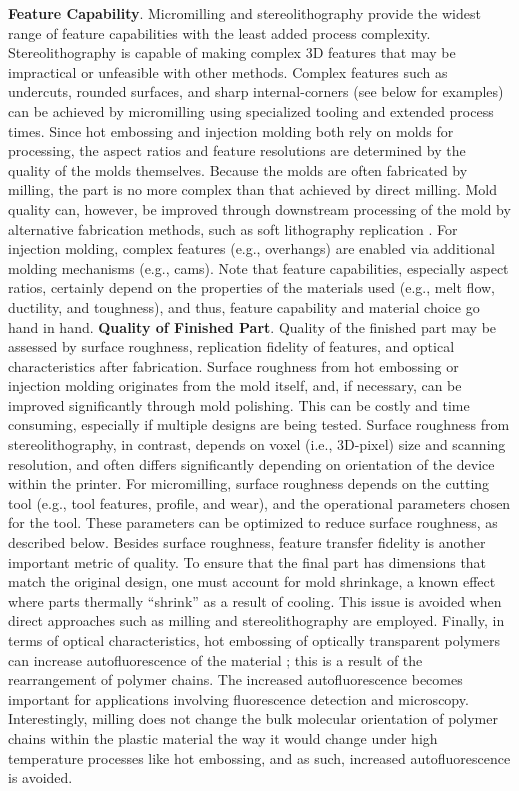 \textbf{Feature Capability}. Micromilling and stereolithography provide the widest range of feature capabilities with the least added process complexity. Stereolithography is capable of making complex 3D features that may be impractical or unfeasible with other methods. Complex features such as undercuts, rounded surfaces, and sharp internal-corners (see below for examples) can be achieved by micromilling using specialized tooling and extended process times. Since hot embossing and injection molding both rely on molds for processing, the aspect ratios and feature resolutions are determined by the quality of the molds themselves. Because the molds are often fabricated by milling, the part is no more complex than that achieved by direct milling. Mold quality can, however, be improved through downstream processing of the mold by alternative fabrication methods, such as soft lithography replication \cite{Young2011}. For injection molding, complex features (e.g., overhangs) are enabled via additional molding mechanisms (e.g., cams). Note that feature capabilities, especially aspect ratios, certainly depend on the properties of the materials used (e.g., melt flow, ductility, and toughness), and thus, feature capability and material choice go hand in hand. 
\textbf{Quality of Finished Part}. Quality of the finished part may be assessed by surface roughness, replication fidelity of features, and optical characteristics after fabrication. Surface roughness from hot embossing or injection molding originates from the mold itself, and, if necessary, can be improved significantly through mold polishing. This can be costly and time consuming, especially if multiple designs are being tested. Surface roughness from stereolithography, in contrast, depends on voxel (i.e., 3D-pixel) size and scanning resolution, and often differs significantly depending on orientation of the device within the printer. For micromilling, surface roughness depends on the cutting tool (e.g., tool features, profile, and wear), and the operational parameters chosen for the tool. These parameters can be optimized to reduce surface roughness, as described below. 
Besides surface roughness, feature transfer fidelity is another important metric of quality. To ensure that the final part has dimensions that match the original design, one must account for mold shrinkage, a known effect where parts thermally “shrink” as a result of cooling. This issue is avoided when direct approaches such as milling and stereolithography are employed.
Finally, in terms of optical characteristics, hot embossing of optically transparent polymers can increase autofluorescence of the material \cite{Young2012}; this is a result of the rearrangement of polymer chains. The increased autofluorescence becomes important for applications involving fluorescence detection and microscopy. Interestingly, milling does not change the bulk molecular orientation of polymer chains within the plastic material the way it would change under high temperature processes like hot embossing, and as such, increased autofluorescence is avoided.

